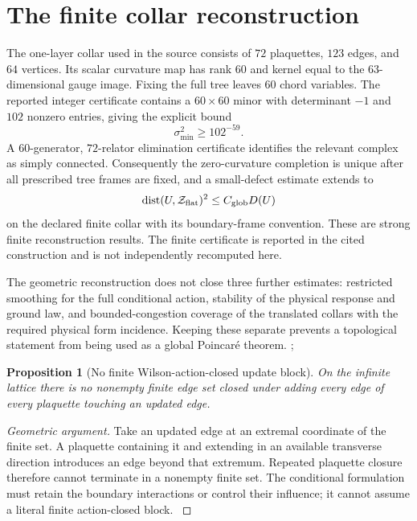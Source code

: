 \documentclass[11pt,oneside,openany]{book}
\newtheorem{proposition}[proposition]{Proposition}
\theoremstyle{definition}
\theoremstyle{remark}
\newcommand{\dist}{\operatorname{dist}}
\newcommand{\src}[2]{\cite[#2]{#1}}
\begin{document}
\section{The finite collar reconstruction}
The one-layer collar used in the source consists of $72$ plaquettes, $123$ edges, and $64$ vertices. Its scalar curvature map has rank $60$ and kernel equal to the $63$-dimensional gauge image. Fixing the full tree leaves $60$ chord variables. The reported integer certificate contains a $60\times60$ minor with determinant $-1$ and $102$ nonzero entries, giving the explicit bound
\begin{equation}\label{eq:collar-sigma}
\sigma_{\min}^2\ge102^{-59}.
\end{equation}
A $60$-generator, $72$-relator elimination certificate identifies the relevant complex as simply connected. Consequently the zero-curvature completion is unique after all prescribed tree frames are fixed, and a small-defect estimate extends to
\begin{equation}\label{eq:collar-distance}
\dist(U,\mathcal Z_{\rm flat})^2\le C_{\rm glob}D(U)
\end{equation}
on the declared finite collar with its boundary-frame convention. These are strong finite reconstruction results. The finite certificate is reported in the cited construction and is not independently recomputed here.

The geometric reconstruction does not close three further estimates: restricted smoothing for the full conditional action, stability of the physical response and ground law, and bounded-congestion coverage of the translated collars with the required physical form incidence. Keeping these separate prevents a topological statement from being used as a global Poincar\'e theorem. \src{F6}{final collar ledger}; \src{F7}{initial continuation}

\begin{proposition}[No finite Wilson-action-closed update block]\label{prop:no-finite-block}
On the infinite lattice there is no nonempty finite edge set closed under adding every edge of every plaquette touching an updated edge.
\end{proposition}
\begin{proof}[Geometric argument]
Take an updated edge at an extremal coordinate of the finite set. A plaquette containing it and extending in an available transverse direction introduces an edge beyond that extremum. Repeated plaquette closure therefore cannot terminate in a nonempty finite set. The conditional formulation must retain the boundary interactions or control their influence; it cannot assume a literal finite action-closed block. \src{F7}{V1}
\end{proof}
\end{document}

